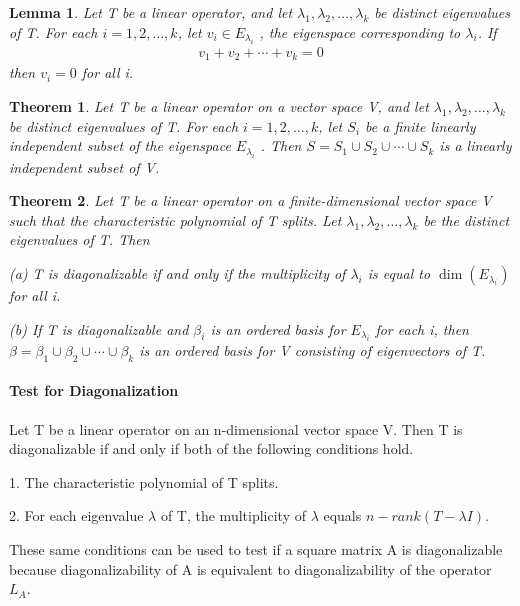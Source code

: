 \documentclass{article}
\theoremstyle{plain}
\newtheorem{theorem}{Theorem}[section]
\newtheorem*{lemma1}{Lemma}
\theoremstyle{plain} %
\begin{document}
\begin{lemma1}
  Let T be a linear operator, and let $\lambda_1, \lambda_2,\ldots,\lambda_k$ be distinct eigenvalues of T. For each $i = 1, 2,\ldots,k$, let $v_i \in E_{\lambda_i}$ , the eigenspace corresponding to $\lambda_i$. If
  \begin{align*}
    v_1+v_2+\cdots+v_k=0
  \end{align*}
  then $v_i = 0$ for all i.
\end{lemma1}

\begin{theorem}
  Let T be a linear operator on a vector space V, and let $\lambda_1, \lambda_2,\ldots,\lambda_k$ be distinct eigenvalues of T. For each $i = 1, 2,\ldots,k$, let $S_i$ be a finite linearly independent subset of the eigenspace $E_{\lambda_i}$ . Then $S = S_1 \cup S_2 \cup\cdots \cup S_k$ is a linearly independent subset of V.
\end{theorem}

\begin{theorem}
  Let T be a linear operator on a finite-dimensional vector space V such that the characteristic polynomial of T splits. Let $\lambda_1, \lambda_2,\ldots,\lambda_k$ be the distinct eigenvalues of T. Then 
  
  (a) T is diagonalizable if and only if the multiplicity of $\lambda_i$ is equal to $\dim(E_{\lambda_i})$ for all i.

  (b) If T is diagonalizable and $\beta_i$ is an ordered basis for $E_{\lambda_i}$ for each i, then $\beta = \beta_1\cup \beta_2\cup\cdots \cup\beta_k$ is an ordered basis for V consisting of eigenvectors of T.
\end{theorem}

\paragraph{Test for Diagonalization}

Let T be a linear operator on an n-dimensional vector space V. Then T is diagonalizable if and only if both of the following conditions hold.

1. The characteristic polynomial of T splits.

2. For each eigenvalue $\lambda$ of T, the multiplicity of $\lambda$ equals $n−rank(T−\lambda I)$.

These same conditions can be used to test if a square matrix A is diagonalizable because diagonalizability of A is equivalent to diagonalizability of the operator $L_A$.
\end{document}
